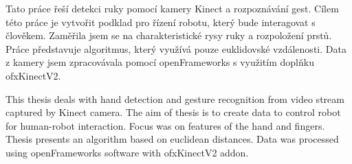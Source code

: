 \startAbstractCz



Tato práce řeší detekci ruky pomocí kamery Kinect a rozpoznávání gest. Cílem této práce je vytvořit podklad pro řízení robotu, který bude interagovat s člověkem. Zaměřila jsem se na charakteristické rysy ruky a rozpoložení prstů.
Práce představuje algoritmus, který využívá pouze euklidovské vzdálenosti. Data z kamery jsem zpracovávala pomocí openFrameworks s využitím doplňku ofxKinectV2.



\stopAbstractCz

\startAbstractEn
This thesis deals with hand detection and gesture recognition from video stream captured by Kinect camera. The aim of thesis is to create data to control robot for human-robot interaction. Focus was on features of the hand and fingers. Thesis presents an algorithm based on euclidean distances. Data was processed using openFrameworks software with ofxKinectV2 addon.
\stopAbstractEn

\endinput

